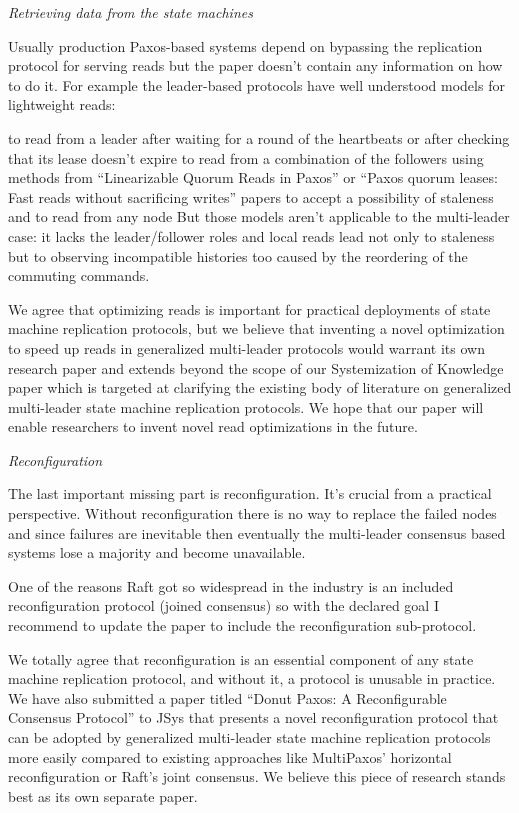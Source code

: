 \documentclass[letterpaper,twocolumn,10pt]{article}
\newenvironment{reviewerquote}
{\list{}{\leftmargin=\parindent\rightmargin=0in}\item[] \itshape \color{ReviewerDarkGray}}%
{\endlist}
\begin{document}
\begin{reviewerquote}
  Retrieving data from the state machines

  Usually production Paxos-based systems depend on bypassing the replication
  protocol for serving reads but the paper doesn't contain any information on
  how to do it. For example the leader-based protocols have well understood
  models for lightweight reads:

  to read from a leader after waiting for a round of the heartbeats or after
  checking that its lease doesn't expire to read from a combination of the
  followers using methods from ``Linearizable Quorum Reads in Paxos'' or
  ``Paxos quorum leases: Fast reads without sacrificing writes'' papers to
  accept a possibility of staleness and to read from any node But those models
  aren't applicable to the multi-leader case: it lacks the leader/follower
  roles and local reads lead not only to staleness but to observing
  incompatible histories too caused by the reordering of the commuting
  commands.
\end{reviewerquote}

We agree that optimizing reads is important for practical deployments of state
machine replication protocols, but we believe that inventing a novel
optimization to speed up reads in generalized multi-leader protocols would
warrant its own research paper and extends beyond the scope of our
Systemization of Knowledge paper which is targeted at clarifying the existing
body of literature on generalized multi-leader state machine replication
protocols. We hope that our paper will enable researchers to invent novel read
optimizations in the future.

\begin{reviewerquote}
  Reconfiguration

  The last important missing part is reconfiguration. It's crucial from a
  practical perspective. Without reconfiguration there is no way to replace the
  failed nodes and since failures are inevitable then eventually the
  multi-leader consensus based systems lose a majority and become unavailable.

  One of the reasons Raft got so widespread in the industry is an included
  reconfiguration protocol (joined consensus) so with the declared goal I
  recommend to update the paper to include the reconfiguration sub-protocol.
\end{reviewerquote}

We totally agree that reconfiguration is an essential component of any state
machine replication protocol, and without it, a protocol is unusable in
practice. We have also submitted a paper titled ``Donut Paxos: A Reconfigurable
Consensus Protocol'' to JSys that presents a novel reconfiguration protocol
that can be adopted by generalized multi-leader state machine replication
protocols more easily compared to existing approaches like MultiPaxos'
horizontal reconfiguration or Raft's joint consensus. We believe this piece of
research stands best as its own separate paper.
\end{document}
